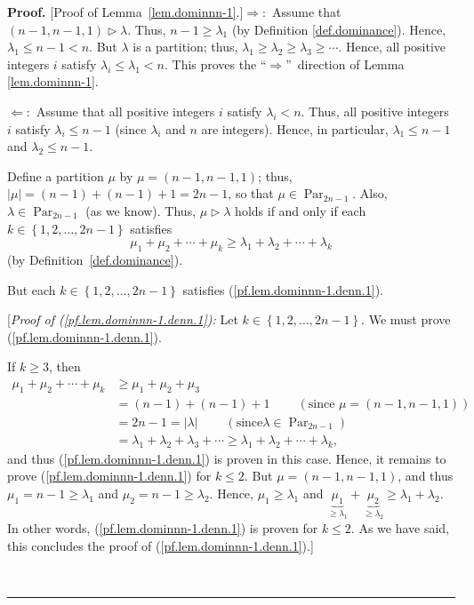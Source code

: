 \documentclass[numbers=enddot,12pt,final,onecolumn,notitlepage]{scrartcl}%
\theoremstyle{definition}
\newenvironment{proof}[1][Proof]{\noindent\textbf{#1.} }{\ \rule{0.5em}{0.5em}}
\newenvironment{verlong}{}{}
\begin{document}
\begin{verlong}
\begin{proof}
[Proof of Lemma~\ref{lem.dominnn-1}.]$\Longrightarrow:$ Assume that $\left(
n-1,n-1,1\right)  \triangleright\lambda$. Thus, $n-1\geq\lambda_{1}$ (by
Definition \ref{def.dominance}). Hence, $\lambda_{1}\leq n-1<n$. But $\lambda$
is a partition; thus, $\lambda_{1}\geq\lambda_{2}\geq\lambda_{3}\geq\cdots$.
Hence, all positive integers $i$ satisfy $\lambda_{i}\leq\lambda_{1}<n$. This
proves the \textquotedblleft$\Longrightarrow$\textquotedblright\ direction of
Lemma \ref{lem.dominnn-1}.

$\Longleftarrow:$ Assume that all positive integers $i$ satisfy $\lambda
_{i}<n$. Thus, all positive integers $i$ satisfy $\lambda_{i}\leq n-1$ (since
$\lambda_{i}$ and $n$ are integers). Hence, in particular, $\lambda_{1}\leq
n-1$ and $\lambda_{2}\leq n-1$.

Define a partition $\mu$ by $\mu=\left(  n-1,n-1,1\right)  $; thus,
$\left\vert \mu\right\vert =\left(  n-1\right)  +\left(  n-1\right)  +1=2n-1$,
so that $\mu\in\operatorname*{Par}\nolimits_{2n-1}$. Also, $\lambda
\in\operatorname*{Par}\nolimits_{2n-1}$ (as we know). Thus, $\mu
\triangleright\lambda$ holds if and only if each $k\in\left\{  1,2,\ldots
,2n-1\right\}  $ satisfies%
\begin{equation}
\mu_{1}+\mu_{2}+\cdots+\mu_{k}\geq\lambda_{1}+\lambda_{2}+\cdots+\lambda_{k}
\label{pf.lem.dominnn-1.denn.1}%
\end{equation}
(by Definition~\ref{def.dominance}).

But each $k\in\left\{  1,2,\ldots,2n-1\right\}  $ satisfies
(\ref{pf.lem.dominnn-1.denn.1}).

[\textit{Proof of (\ref{pf.lem.dominnn-1.denn.1}):} Let $k\in\left\{
1,2,\ldots,2n-1\right\}  $. We must prove (\ref{pf.lem.dominnn-1.denn.1}).

If $k\geq3$, then
\begin{align*}
\mu_{1}+\mu_{2}+\cdots+\mu_{k}  &  \geq\mu_{1}+\mu_{2}+\mu_{3}\\
&  =\left(  n-1\right)  +\left(  n-1\right)  +1\ \ \ \ \ \ \ \ \ \ \left(
\text{since }\mu=\left(  n-1,n-1,1\right)  \right) \\
&  =2n-1=\left\vert \lambda\right\vert \ \ \ \ \ \ \ \ \ \ \left(  \text{since
}\lambda\in\operatorname*{Par}\nolimits_{2n-1}\right) \\
&  =\lambda_{1}+\lambda_{2}+\lambda_{3}+\cdots\geq\lambda_{1}+\lambda
_{2}+\cdots+\lambda_{k},
\end{align*}
and thus (\ref{pf.lem.dominnn-1.denn.1}) is proven in this case. Hence, it
remains to prove (\ref{pf.lem.dominnn-1.denn.1}) for $k\leq2$. But
$\mu=\left(  n-1,n-1,1\right)  $, and thus $\mu_{1}=n-1\geq\lambda_{1}$ and
$\mu_{2}=n-1\geq\lambda_{2}$. Hence, $\mu_{1}\geq\lambda_{1}$ and
$\underbrace{\mu_{1}}_{\geq\lambda_{1}}+\underbrace{\mu_{2}}_{\geq\lambda_{2}%
}\geq\lambda_{1}+\lambda_{2}$. In other words, (\ref{pf.lem.dominnn-1.denn.1})
is proven for $k\leq2$. As we have said, this concludes the proof of
(\ref{pf.lem.dominnn-1.denn.1}).]


\end{proof}
\end{verlong}
\end{document}
